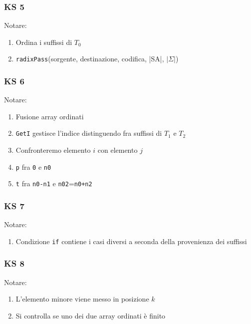 \begin{frame}[fragile]
\frametitle{KS 5}

\begin{block}{Notare:}
\begin{enumerate}
\item
Ordina i suffissi di $T_{0}$
\item
\lstinline!radixPass!(sorgente, destinazione, codifica, |SA|, $|\Sigma|$)
\end{enumerate}
\end{block}
\end{frame}

\begin{frame}[fragile]
\frametitle{KS 6}


\begin{block}{Notare:}
\begin{enumerate}
\item
Fusione array ordinati
\item
\lstinline!GetI! gestisce l'indice distinguendo fra suffissi di $T_{1}$ e
$T_{2}$
\item
Confronteremo elemento $i$ con elemento $j$
\item
\lstinline!p! fra \lstinline!0! e \lstinline!n0!
\item
\lstinline!t! fra \lstinline!n0-n1! e \lstinline!n02!=\lstinline!n0+n2!
\end{enumerate}
\end{block}
\end{frame}

\begin{frame}[fragile]
\frametitle{KS 7}

\begin{block}{Notare:}
\begin{enumerate}
\item
Condizione \lstinline!if! contiene i casi diversi a seconda della
provenienza dei suffissi
\end{enumerate}
\end{block}
\end{frame}

\begin{frame}[fragile]
\frametitle{KS 8}

\begin{block}{Notare:}
\begin{enumerate}
\item
L'elemento minore viene messo in posizione $k$
\item
Si controlla se uno dei due array ordinati è finito
\end{enumerate}
\end{block}
\end{frame}


